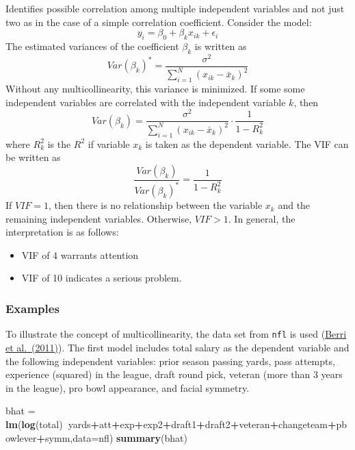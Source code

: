 \documentclass[
]{article}
\newenvironment{Shaded}{\begin{snugshade}}{\end{snugshade}}
\newcommand{\DataTypeTok}[1]{\textcolor[rgb]{0.13,0.29,0.53}{#1}}
\newcommand{\KeywordTok}[1]{\textcolor[rgb]{0.13,0.29,0.53}{\textbf{#1}}}
\newcommand{\NormalTok}[1]{#1}
\newcommand{\OperatorTok}[1]{\textcolor[rgb]{0.81,0.36,0.00}{\textbf{#1}}}
\newcommand{\StringTok}[1]{\textcolor[rgb]{0.31,0.60,0.02}{#1}}
\providecommand{\tightlist}{%
  \setlength{\itemsep}{0pt}\setlength{\parskip}{0pt}}
\begin{document}
Identifies possible correlation among multiple independent variables and not just two as in the case of a simple correlation coefficient. Consider the model:
\[y_i = \beta_0 + \beta_k x_{ik} + \epsilon_i\]
The estimated variances of the coefficient \(\beta_k\) is written as
\[Var(\beta_k)^* = \frac{\sigma^2}{\sum_{i=1}^N (x_{ik}-\bar{x}_k)^2}\]
Without any multicollinearity, this variance is minimized. If some some independent variables are correlated with the independent variable \(k\), then
\[Var(\beta_k) = \frac{\sigma^2}{\sum_{i=1}^N (x_{ik}-\bar{x}_k)^2} \cdot \frac{1}{1-R^2_k}\]
where \(R^2_k\) is the \(R^2\) if variable \(x_k\) is taken as the dependent variable. The VIF can be written as
\[\frac{Var(\beta_k)}{Var(\beta_k)^*}=\frac{1}{1-R^2_k}\]
If \(VIF=1\), then there is no relationship between the variable \(x_k\) and the remaining independent variables. Otherwise, \(VIF>1\). In general, the interpretation is as follows:

\begin{itemize}
\tightlist
\item
  VIF of 4 warrants attention
\item
  VIF of 10 indicates a serious problem.
\end{itemize}

\hypertarget{examples}{%
\subsubsection{Examples}\label{examples}}

To illustrate the concept of multicollinearity, the data set from \texttt{nfl} is used (\href{http://dx.doi.org/10.1016/j.econlet.2011.02.018}{Berri et al.~(2011)}). The first model includes total salary as the dependent variable and the following independent variables: prior season passing yards, pass attempts, experience (squared) in the league, draft round pick, veteran (more than 3 years in the league), pro bowl appearance, and facial symmetry.

\begin{Shaded}
\begin{Highlighting}[]
\NormalTok{bhat =}\StringTok{ }\KeywordTok{lm}\NormalTok{(}\KeywordTok{log}\NormalTok{(total)}\OperatorTok{~}\NormalTok{yards}\OperatorTok{+}\NormalTok{att}\OperatorTok{+}\NormalTok{exp}\OperatorTok{+}\NormalTok{exp2}\OperatorTok{+}\NormalTok{draft1}\OperatorTok{+}\NormalTok{draft2}\OperatorTok{+}\NormalTok{veteran}\OperatorTok{+}\NormalTok{changeteam}\OperatorTok{+}\NormalTok{pbowlever}\OperatorTok{+}\NormalTok{symm,}\DataTypeTok{data=}\NormalTok{nfl)}
\KeywordTok{summary}\NormalTok{(bhat)}
\end{Highlighting}
\end{Shaded}
\end{document}
